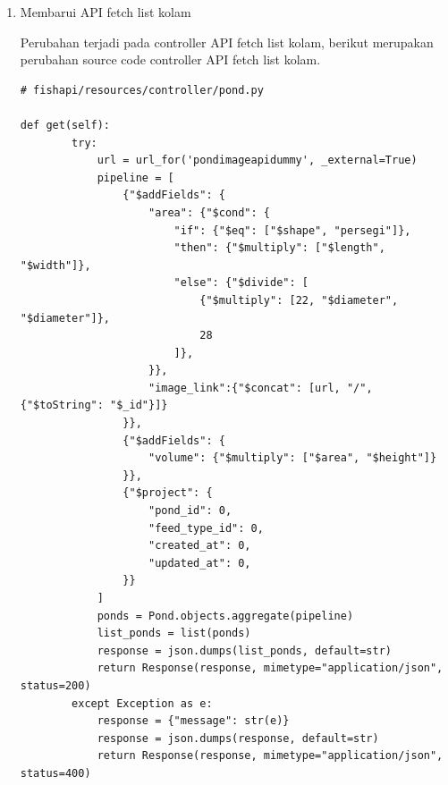 \begin{enumerate}[1.]
Berikut merupakan hasil test request yang dari API edit kolam.

cURL:

\begin{lstlisting}
curl --location -g --request PUT 'http://jft.web.id/fishapi/api/ponds/{pond_id}' \
--form 'material="terpal"'
\end{lstlisting}

response json:

\begin{lstlisting}
{
  "message": "success change data pond",
  "id": "625d7033a9a73e090c65cda2"
}
\end{lstlisting}

\item Membarui API fetch list kolam

Perubahan terjadi pada controller API fetch list kolam, berikut merupakan perubahan source code controller API fetch list kolam.

\begin{lstlisting}
# fishapi/resources/controller/pond.py

def get(self):
        try:
            url = url_for('pondimageapidummy', _external=True)
            pipeline = [
                {"$addFields": {
                    "area": {"$cond": {
                        "if": {"$eq": ["$shape", "persegi"]},
                        "then": {"$multiply": ["$length", "$width"]},
                        "else": {"$divide": [
                            {"$multiply": [22, "$diameter", "$diameter"]},
                            28
                        ]},
                    }},
                    "image_link":{"$concat": [url, "/", {"$toString": "$_id"}]}
                }},
                {"$addFields": {
                    "volume": {"$multiply": ["$area", "$height"]}
                }},
                {"$project": {
                    "pond_id": 0,
                    "feed_type_id": 0,
                    "created_at": 0,
                    "updated_at": 0,
                }}
            ]
            ponds = Pond.objects.aggregate(pipeline)
            list_ponds = list(ponds)
            response = json.dumps(list_ponds, default=str)
            return Response(response, mimetype="application/json", status=200)
        except Exception as e:
            response = {"message": str(e)}
            response = json.dumps(response, default=str)
            return Response(response, mimetype="application/json", status=400)\end{lstlisting}
            

\end{enumerate}
